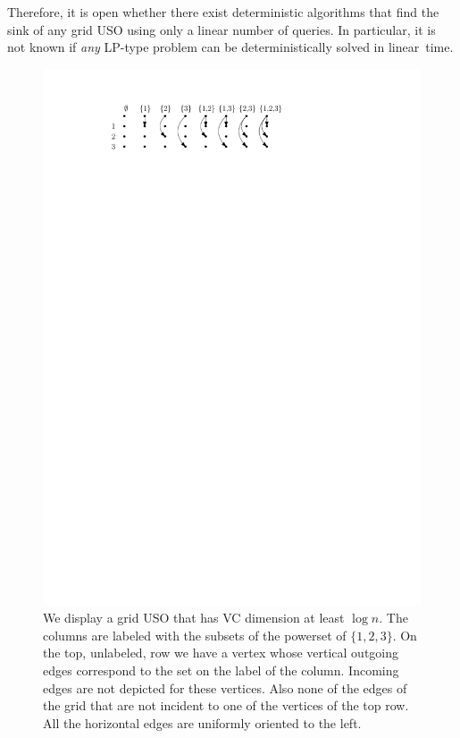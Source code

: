 \documentclass[runningheads,a4paper]{llncs}
\begin{document}
Therefore, it is open whether there exist deterministic algorithms that find the sink of any grid USO using only a linear number of queries. 
In particular, it is not known if \emph{any} LP-type problem can be deterministically solved in linear~time. 
\begin{figure}[htbp] 
  	\centering
  	\includegraphics{shatteredgrid.pdf}
  	\caption{\small We display a grid USO that has VC dimension at least $\log n$. 
	  The columns are labeled with the subsets of the powerset of $\{1,2,3\}$. On the top, unlabeled, row we have a vertex whose 
	  vertical outgoing edges correspond to the set on the label of the column. Incoming edges are not depicted for these vertices. Also none 
	  of the edges of the grid that are not incident to one of the vertices of the top row. All the horizontal edges are uniformly oriented to the left.} 
  	\label{fig:shatteredgrid}
  \end{figure}
  
\end{document}
